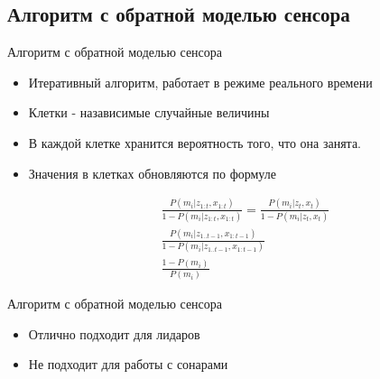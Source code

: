 \documentclass[9pt]{beamer}
\begin{document}
\subsection{Алгоритм с обратной моделью сенсора}

\begin{frame}{Алгоритм с обратной моделью сенсора}

\begin{itemize}
  \item
  {
    Итеративный алгоритм, работает в режиме реального времени
  }
  \item
  {
    Клетки - назависимые случайные величины
  }
  \item
  {
    В каждой клетке хранится вероятность того, что она занята.
  }
  \item
  {
    Значения в клетках обновляются по формуле

    \begin{equation}
      \begin{split}
        \frac{P(m_i | z_{1:t}, x_{1:t})}{1 - P(m_i | z_{1:t}, x_{1:t})} = 
        \frac{P(m_i | z_t, x_t)}{1- P(m_i | z_t, x_t)}\\
        \frac{P(m_i | z_{1..t-1}, x_{1:t-1})}{1- P(m_i | z_{1..t-1}, x_{1:t-1})}\\
        \frac{1 - P(m_i)}{P(m_{i})}
      \end{split}
    \end{equation}
  }
\end{itemize}
\end{frame}

\begin{frame}{Алгоритм с обратной моделью сенсора}

\begin{itemize}
  \item
  {
    Отлично подходит для лидаров
  }
  \item
  {
    Не подходит для работы с сонарами
  }
\end{itemize}
\end{frame}
\end{document}
